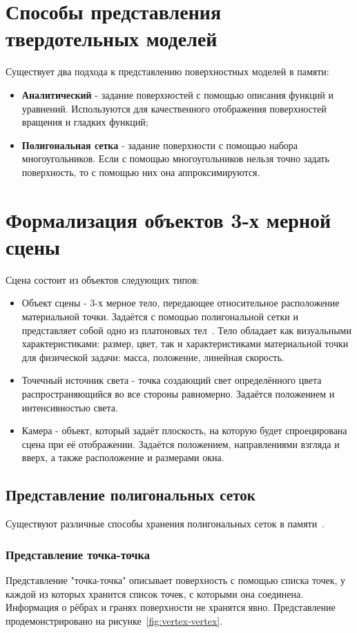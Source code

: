 \section{Способы представления твердотельных моделей}
Существует два подхода к представлению поверхностных моделей в памяти:
\begin{itemize}
	\item \textbf{Аналитический} - задание поверхностей с помощью описания функций и уравнений. Используются для качественного отображения поверхностей вращения и гладких функций;
	\item \textbf{Полигональная сетка} - задание поверхности с помощью набора многоугольников. Если с помощью многоугольников нельзя точно задать поверхность, то с помощью них она аппроксимируются.
\end{itemize}

\section{Формализация объектов 3-х мерной сцены}

Сцена состоит из объектов следующих типов:
\begin{itemize}
	\item Объект сцены - 3-х мерное тело, передающее относительное расположение материальной точки. Задаётся с помощью полигональной сетки и представляет собой одно из платоновых тел~\cite{platon-body}. Тело обладает как визуальными характеристиками: размер, цвет, так и характеристиками материальной точки для физической задачи: масса, положение, линейная скорость.
	\item Точечный источник света - точка создающий свет определённого цвета распространяющийся во все стороны равномерно. Задаётся положением и интенсивностью света.
	\item Камера - объект, который задаёт плоскость, на которую будет спроецирована сцена при её отображении. Задаётся положением, направлениями взгляда и вверх, а также расположение и размерами окна.
\end{itemize}


\subsection*{Представление полигональных сеток}
Существуют различные способы хранения полигональных сеток в памяти~\cite{colins}.

\subsubsection{Представление точка-точка}
Представление "точка-точка" описывает поверхность с помощью списка точек, у каждой из которых хранится список точек, с которыми она соединена. Информация о рёбрах и гранях поверхности не хранятся явно. Представление продемонстрировано на рисунке~\ref{fig:vertex-vertex}.


